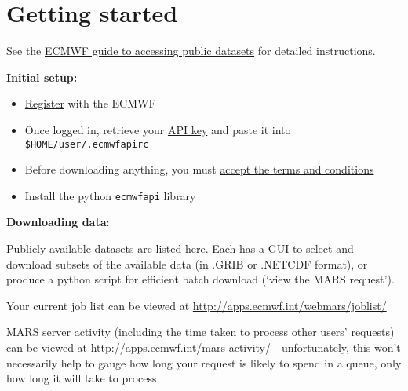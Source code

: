 \documentclass[10pt,fleqn]{article}
\begin{document}
\section*{Getting started}

See the \href{https://software.ecmwf.int/wiki/display/WEBAPI/Access+ECMWF+Public+Datasets}{ECMWF guide to accessing public datasets} for detailed  instructions.

\textbf{Initial setup:}

\begin{itemize}

\item \href{https://apps.ecmwf.int/registration/}{Register} with the ECMWF

\item Once logged in, retrieve your \href{https://api.ecmwf.int/v1/key/}{API key} and paste it into \texttt{\$HOME/user/.ecmwfapirc}

\item Before downloading anything, you must \href{http://apps.ecmwf.int/datasets/data/interim-full-daily/licence/}{accept the terms and conditions}
\item Install the python \texttt{ecmwfapi} library \\[5pt]
\end{itemize}

\vspace{10pt}
\textbf{Downloading data}:

Publicly available datasets are listed \href{http://apps.ecmwf.int/datasets/}{here}. Each has a GUI to select and download subsets of the available data (in .GRIB or .NETCDF format), or produce a python script for efficient batch download (`view the MARS request').

Your current job list can be viewed at \url{http://apps.ecmwf.int/webmars/joblist/}

MARS server activity (including the time taken to process other users' requests) can be viewed at \url{http://apps.ecmwf.int/mars-activity/} - unfortunately, this won't necessarily help to gauge how long your request is likely to spend in a queue, only how long it will take to process.\\[10pt]
\end{document}
